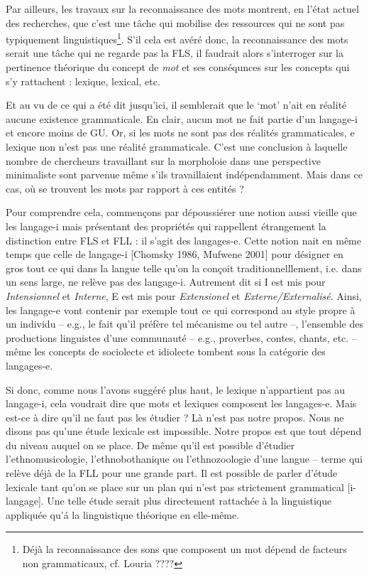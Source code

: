       
      Par ailleurs, les travaux sur la reconnaissance des mots montrent, en l'\'etat actuel des recherches,  que c'est une t\^ache qui mobilise des ressources qui ne sont pas typiquement linguistiques\footnote{D\'ej\`a la reconnaissance des sons que composent un mot d\'epend de facteurs non grammaticaux, cf. Louria ????}. S'il cela est av\'er\'e donc, la reconnaissance des mots serait une t\^ache qui ne regarde pas la FLS, il faudrait alors s'interroger sur la pertinence th\'eorique du concept de \textit{mot} et ses cons\'equnces sur les concepts qui s'y rattachent : lexique, lexical, etc. 
      
      Et au vu de ce qui a \'et\'e dit jusqu'ici, il semblerait que le `mot' n'ait en r\'ealit\'e aucune existence grammaticale. En clair, aucun mot ne fait partie d'un langage-i et encore moins de GU. Or, si les mots ne sont pas des r\'ealit\'es grammaticales, e lexique non n'est pas une r\'ealit\'e grammaticale. C'est une conclusion \`a laquelle nombre de chercheurs travaillant sur la morpholoie dans une perspective minimaliste sont parvenue m\^eme s'ils travaillaient ind\'ependamment. Mais dans ce cas, o\`u se trouvent les mots par rapport \`a ces entit\'es ? 
      
      Pour comprendre cela, commen\c cons par d\'epoussi\'erer une notion aussi vieille que les langage-i mais pr\'esentant des propri\'et\'es qui rappellent \'etrangement la distinction entre FLS et FLL : il s'agit des langages-e. Cette notion nait en m\^eme temps que celle de langage-i [Chomsky 1986, Mufwene 2001] pour d\'esigner en gros tout ce qui dans la langue telle qu'on la con\c coit traditionnelllement, i.e. dans un sens large, ne rel\`eve pas des langage-i. Autrement dit si I est mis pour \textit{Intensionnel} et \textit{Interne}, E est mis pour \textit{Extensionel} et \textit{Externe/Externalis\'e}. Ainsi, les langage-e vont contenir par exemple tout ce qui correspond au style propre \`a un individu -- e.g., le fait qu'il pr\'ef\`ere tel m\'ecanisme ou tel autre --, l'ensemble des productions linguistes d'une communaut\'e -- e.g., proverbes, contes, chants, etc. --  m\^eme les concepts de sociolecte et idiolecte tombent sous la cat\'egorie des langages-e.
      
      Si donc, comme nous l'avons sugg\'er\'e plus haut, le lexique n'appartient pas au langage-i, cela voudrait dire que mots et lexiques composent les langages-e. Mais est-ce \`a dire qu'il ne faut pas les \'etudier ? L\`a n'est pas notre propos.      
      Nous ne disons pas qu'une \'etude lexicale est impossible. Notre propos est que tout d\'epend du niveau auquel on se place. De m\^eme qu'il est possible d'\'etudier l'ethnomu\-si\-co\-logie, l'ethnobothanique ou l'ethnozoologie d'une langue -- terme qui rel\`eve d\'ej\`a de la FLL pour une grande part. Il est possible de parler d'\'etude lexicale tant qu'on se place sur un plan qui n'est pas strictement grammatical [i-langage]. Une telle \'etude serait plus directement rattach\'ee \`a la linguistique appliqu\'ee qu'\'a la linguistique th\'eorique en elle-m\^eme.
      
